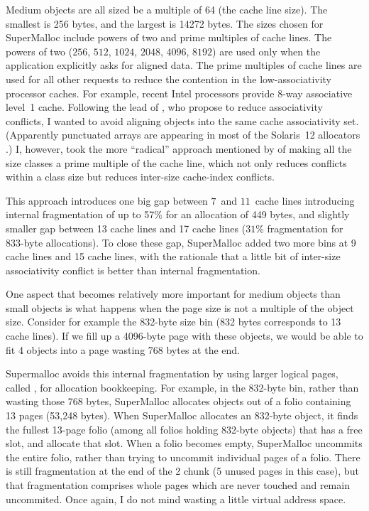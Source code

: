 \documentclass[natbib,sort&compress]{sigplanconf}
\begin{document}

Medium objects are all sized be a multiple of 64 (the cache line
size).  The smallest is 256 bytes, and the largest is 14272 bytes.
The sizes chosen for SuperMalloc include powers of two and prime
multiples of cache lines.  The powers of two ($256$, $512$, $1024$,
$2048$, $4096$, $8192$) are used only when the application explicitly
asks for aligned data.  The prime multiples of cache lines are used
for all other requests to reduce the contention in the
low-associativity processor caches. For example, recent Intel
processors provide 8-way associative level~1 cache.  Following the
lead of \cite{AfekDiMo11}, who propose  to
reduce associativity conflicts, I wanted to avoid aligning objects
into the same cache associativity set. (Apparently punctuated arrays
are appearing in most of the Solaris~12 allocators \cite{Dice14b}.)
I, however, took the more ``radical'' approach mentioned by
\cite{Dice14a} of making all the size classes a prime multiple of the
cache line, which not only reduces conflicts within a class size but
reduces inter-size cache-index conflicts.

This approach introduces one big gap between $7$~and $11$~cache lines
introducing internal fragmentation of up to 57\% for an allocation of
449 bytes, and slightly smaller gap between 13 cache lines and 17
cache lines ($31$\% fragmentation for 833-byte allocations).  To close
these gap, SuperMalloc added two more bins at 9 cache lines and 15
cache lines, with the rationale that a little bit of inter-size
associativity conflict is better than internal fragmentation.

One aspect that becomes relatively more important for medium objects
than small objects is what happens when the page size is not a
multiple of the object size.  Consider for example the 832-byte size
bin (832 bytes corresponds to 13 cache lines).  If we fill up a
4096-byte page with these objects, we would be able to fit 4 objects
into a page wasting 768 bytes at the end.  

Supermalloc avoids this internal fragmentation by using larger logical
pages, called , for allocation bookkeeping.  For example,
in the 832-byte bin, rather than wasting those 768 bytes, SuperMalloc
allocates objects out of a folio containing 13 pages (53,248
bytes). When SuperMalloc allocates an 832-byte object, it finds the fullest
13-page folio (among all folios holding 832-byte objects) that has a
free slot, and allocate that slot.  When a folio becomes empty, SuperMalloc
uncommits the entire folio, rather than trying to uncommit individual
pages of a folio.  There is still fragmentation at the end of the
\unit{2}\mebi\byte{} chunk (5 unused pages in this case), but that
fragmentation comprises whole pages which are never touched and remain
uncommited.  Once again, I do not mind wasting a little virtual
address space.
\end{document}
